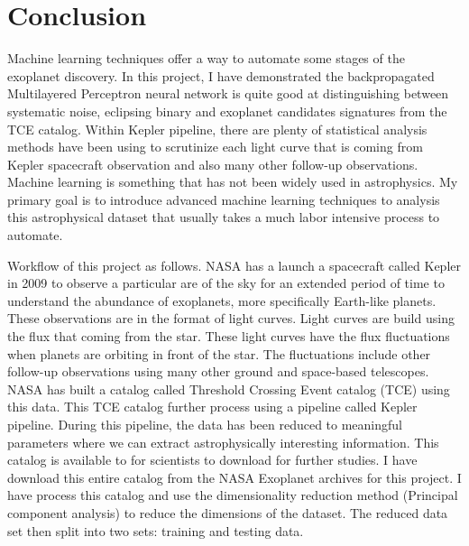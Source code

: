 \chapter{Conclusion}


Machine learning techniques offer a way to automate some stages of the exoplanet discovery. In this project, I have demonstrated the backpropagated Multilayered Perceptron neural network is quite good at distinguishing between systematic noise, eclipsing binary and exoplanet candidates signatures from the TCE catalog. Within Kepler pipeline, there are plenty of statistical analysis methods have been using to scrutinize each light curve that is coming from Kepler spacecraft observation and also many other follow-up observations. Machine learning is something that has not been widely used in astrophysics. My primary goal is to introduce advanced machine learning techniques to analysis this astrophysical dataset that usually takes a much labor intensive process to automate. 

Workflow of this project as follows. NASA has a launch a spacecraft called Kepler in 2009 to observe a particular are of the sky for an extended period of time to understand the abundance of exoplanets, more specifically Earth-like planets. These observations are in the format of light curves. Light curves are build using the flux that coming from the star. These light curves have the flux fluctuations when planets are orbiting in front of the star. The fluctuations include other follow-up observations using many other ground and space-based telescopes. NASA has built a catalog called Threshold Crossing Event catalog (TCE) using this data. This TCE catalog further process using a pipeline called Kepler pipeline. During this pipeline, the data has been reduced to meaningful parameters where we can extract astrophysically interesting information. This catalog is available to for scientists to download for further studies. I have download this entire catalog from the NASA Exoplanet archives for this project. I have process this catalog and use the dimensionality reduction method (Principal component analysis) to reduce the dimensions of the dataset. The reduced data set then split into two sets: training and testing data. 

